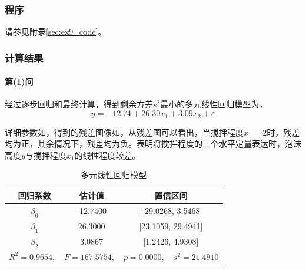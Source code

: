 \subsubsection{程序}

请参见附录\ref{sec:ex9_code}。

\subsubsection{计算结果}

\paragraph{第(1)问} 经过逐步回归和最终计算，得到剩余方差$s^2$最小的多元线性回归模型为，
\begin{equation}\label{eq:ex9_x1_linear}
    y = -12.74 + 26.30 x_1 + 3.09 x_2 + \varepsilon
\end{equation}

详细参数如，得到的残差图像如，从残差图可以看出，当搅拌程度$x_1=2$时，残差均为正，其余情况下，残差均为负。表明将搅拌程度的三个水平定量表达时，泡沫高度$y$与搅拌程度$x_1$的线性程度较差。

\begin{table}[H]
    \centering
    \caption{多元线性回归模型}
    \label{tab:ex9_x1_linear}
    \begin{tabular}{|c|c|c|}
        \hline
        回归系数 & 估计值 & 置信区间\\
        \hline
        \hline
        \(\beta_0\) & -12.7400 & [-29.0268, 3.5468]\\
        \hline
        \(\beta_1\) & 26.3000 & [23.1059, 29.4941]\\
        \hline
        \(\beta_2\) & 3.0867 & [1.2426, 4.9308]\\
        \hline
        \multicolumn{3}{|c|}{$R^2=0.9654, \quad F=167.5754, \quad p=0.0000, \quad s^2=21.4910$}\\
        \hline
    \end{tabular}
\end{table}

